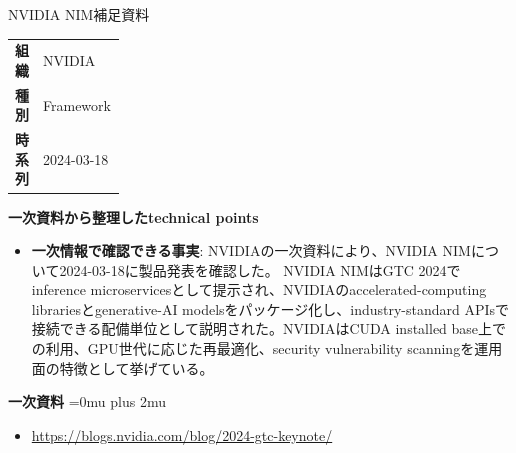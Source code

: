 \begin{technicalnote}{NVIDIA NIM}{補足資料}
\begingroup
\begin{tabularx}{\linewidth}{@{}>{\bfseries}p{0.22\linewidth}X@{}}
組織 & NVIDIA \\
種別 & Framework \\
時系列 & 2024-03-18 \\
\end{tabularx}
\smallskip
{\bfseries 一次資料から整理したtechnical points}
\begin{itemize}[leftmargin=1.5em,itemsep=0.35em]
\item \textbf{一次情報で確認できる事実}: NVIDIAの一次資料により、NVIDIA NIMについて2024-03-18に製品発表を確認した。 NVIDIA NIMはGTC 2024でinference microservicesとして提示され、NVIDIAのaccelerated-computing librariesとgenerative-AI modelsをパッケージ化し、industry-standard APIsで接続できる配備単位として説明された。NVIDIAはCUDA installed base上での利用、GPU世代に応じた再最適化、security vulnerability scanningを運用面の特徴として挙げている。
\end{itemize}
\begin{minipage}{\linewidth}
\begin{samepage}
{\bfseries 一次資料}
\begingroup\sloppy
\Urlmuskip=0mu plus 2mu\relax
\begin{itemize}[leftmargin=1.5em,itemsep=0.25em]
\item {\scriptsize\url{https://blogs.nvidia.com/blog/2024-gtc-keynote/}}
\end{itemize}
\endgroup
\end{samepage}
\end{minipage}
\endgroup
\end{technicalnote}
\medskip
